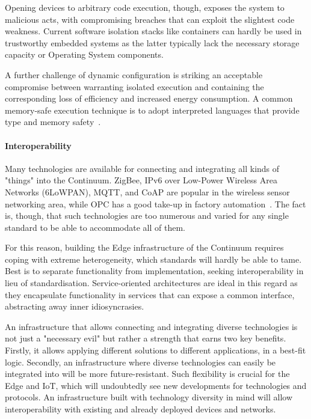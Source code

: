 Opening devices to arbitrary code execution, though, exposes the system to malicious acts, with compromising breaches that can exploit the slightest code weakness.
Current software isolation stacks like containers can hardly be used in trustworthy embedded systems as the latter typically lack the necessary storage capacity or Operating System components.

A further challenge of dynamic configuration is striking an acceptable compromise between warranting isolated execution and containing the corresponding loss of efficiency and increased energy consumption. A common memory-safe execution technique is to adopt interpreted languages that provide type and memory safety~\cite{jacobsson2020virtual, brzoza2016embedded}.

\paragraph{Interoperability}\label{p:interoperability}

Many technologies are available for connecting and integrating all kinds of "things" into the Continuum. 
ZigBee, IPv6 over Low-Power Wireless Area Networks (6LoWPAN), MQTT, and CoAP are popular in the wireless sensor networking area, while OPC has a good take-up in factory automation~\cite{al2020investigating}.
The fact is, though, that such technologies are too numerous and varied for any single standard to be able to accommodate all of them.

For this reason, building the Edge infrastructure of the Continuum requires coping with extreme heterogeneity, which standards will hardly be able to tame.
Best is to separate functionality from implementation, seeking interoperability in lieu of standardisation. Service-oriented architectures are ideal in this regard as they encapsulate functionality in services that can expose a common interface, abstracting away inner idiosyncrasies.

An infrastructure that allows connecting and integrating diverse technologies is not just a "necessary evil" but rather a strength that earns two key benefits. Firstly, it allows applying different solutions to different applications, in a best-fit logic. 
Secondly, an infrastructure where diverse technologies can easily be integrated into will be more future-resistant. 
Such flexibility is crucial for the Edge and IoT, which will undoubtedly see new developments for technologies and protocols. An infrastructure built with technology diversity in mind will allow interoperability with existing and already deployed devices and networks.

